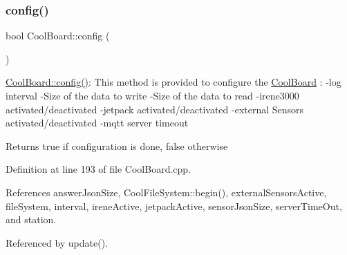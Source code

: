 \subsubsection{\texorpdfstring{config()}{config()}}
{\footnotesize\ttfamily bool Cool\+Board\+::config (\begin{DoxyParamCaption}{ }\end{DoxyParamCaption})}

\hyperlink{classCoolBoard_a583a874c09c07e70a6eb9229fc4beddb}{Cool\+Board\+::config()}\+: This method is provided to configure the \hyperlink{classCoolBoard}{Cool\+Board} \+: -\/log interval -\/\+Size of the data to write -\/\+Size of the data to read -\/irene3000 activated/deactivated -\/jetpack activated/deactivated -\/external Sensors activated/deactivated -\/mqtt server timeout

\begin{DoxyReturn}{Returns}
true if configuration is done, false otherwise 
\end{DoxyReturn}


Definition at line 193 of file Cool\+Board.\+cpp.



References answer\+Json\+Size, Cool\+File\+System\+::begin(), external\+Sensors\+Active, file\+System, interval, irene\+Active, jetpack\+Active, sensor\+Json\+Size, server\+Time\+Out, and station.



Referenced by update().


